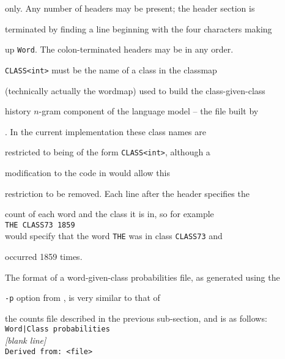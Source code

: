 only.  Any number of headers may be present; the header section is


terminated by finding a line beginning with the four characters making


up {\tt Word}. The colon-terminated headers may be in any order.





{\tt CLASS<int>} must be the name of a class in the classmap


(technically actually the wordmap) used to build the class-given-class


history $n$-gram component of the language model -- the file built by


.  In the current implementation these class names are


restricted to being of the form {\tt CLASS<int>}, although a


modification to the code in  would allow this


restriction to be removed.  Each line after the header specifies the


count of each word and the class it is in, so for example\\


\texttt{THE CLASS73 1859}\\


would specify that the word {\tt THE} was in class {\tt CLASS73} and


occurred 1859 times.












The format of a word-given-class probabilities file, as generated using the


\texttt{-p} option from , is very similar to that of


the counts file described in the previous sub-section, and is as follows:\\


\texttt{Word|Class probabilities}\\


\textit{[blank line]}\\


\texttt{Derived from: <file>}\\


